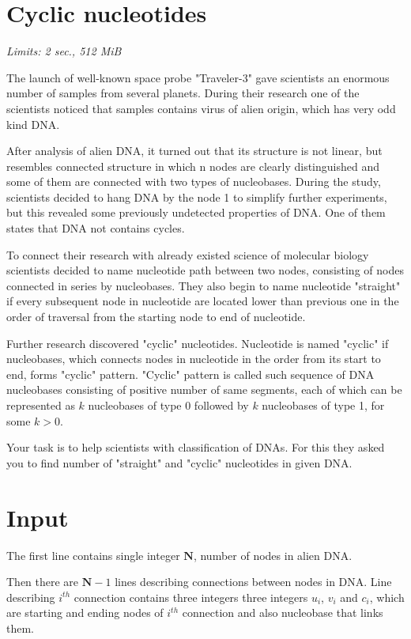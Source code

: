 \documentclass [11pt, a4paper, oneside, notitlepage] {article}
\begin{document}
\section*{Cyclic nucleotides}
\hspace{1cm}
\emph{Limits: 2 sec., 512 MiB}
\bigskip

The launch of well-known space probe "Traveler-3" gave scientists an enormous number of samples from several planets.
During their research one of the scientists noticed that samples contains virus of alien origin, which has very odd kind DNA.

After analysis of alien DNA, it turned out that its structure is not linear, but resembles connected structure in which n nodes are clearly distinguished and some of them are connected with two types of nucleobases. 
During the study, scientists decided to hang DNA by the node 1 to simplify further experiments, but this revealed some previously undetected properties of DNA. One of them states that DNA not contains cycles.

To connect their research with already existed science of molecular biology scientists decided to name nucleotide path between two nodes, consisting of nodes connected in series by nucleobases. 
They also begin to name nucleotide "straight" if every subsequent node in nucleotide are located lower than previous one in the order of traversal from the starting node to end of nucleotide.  

Further research discovered "cyclic" nucleotides. Nucleotide is named "cyclic" if nucleobases, which connects nodes in nucleotide in the order from its start to end, forms "cyclic" pattern.
"Cyclic" pattern is called such sequence of DNA nucleobases consisting of positive number of same segments, each of which can be represented as $k$ nucleobases of type 0 followed by $k$ nucleobases of type 1, for some $k > 0$.

Your task is to help scientists with classification of DNAs. For this they asked you to find number of "straight" and "cyclic" nucleotides in given DNA.

\section*{Input}

The first line contains single integer $\mathbf{N}$, number of nodes in alien DNA.

Then there are $\mathbf{N} - 1$ lines describing connections between nodes in DNA. 
Line describing $i^{th}$ connection contains three integers three integers $u_i$, $v_i$ and $c_i$, which are starting and ending nodes of $i^{th}$ connection and also nucleobase that links them.
\end{document}
